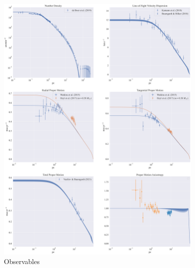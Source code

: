 \begin{figure}
	\begin{center}
		\includegraphics[width=0.9\textwidth]{figures/low_bin_model/obs_panel.png}
	\end{center}
	\caption{Observables}
	\label{fig:low_bin_model_obs_panel}
\end{figure}


